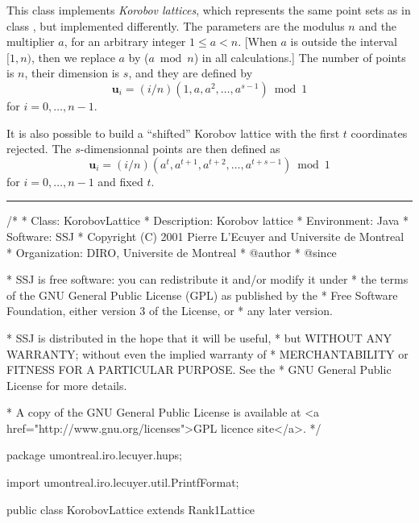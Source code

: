 
This class implements \emph{Korobov lattices}, which represents the same point
sets as in class , but implemented differently.
The parameters are the modulus $n$ and the multiplier $a$, for an arbitrary
integer $1 \le a < n$. [When  $a$ is outside the interval $[1,n)$, then we
replace  $a$ by ($a \bmod n$) in all calculations.]
The number of points is $n$, their dimension is
$s$, and they are defined by
\[
  \mathbf{u}_i = (i/n)(1, a, a^2, \ldots, a^{s-1}) \bmod 1
\]
for $i=0,\dots,n-1$.

It is also possible to build a ``shifted'' Korobov lattice with the first
$t$ coordinates rejected. The $s$-dimensionnal points are then defined as
$$
  \mathbf{u}_i = (i/n)(a^{t}, a^{t+1}, a^{t+2}, \ldots, a^{t+s-1}) \bmod 1
$$
for $i=0,\dots,n-1$ and fixed $t$.

\bigskip\hrule\bigskip

\begin{code}
\begin{hide}
/*
 * Class:        KorobovLattice
 * Description:  Korobov lattice
 * Environment:  Java
 * Software:     SSJ
 * Copyright (C) 2001  Pierre L'Ecuyer and Universite de Montreal
 * Organization: DIRO, Universite de Montreal
 * @author
 * @since

 * SSJ is free software: you can redistribute it and/or modify it under
 * the terms of the GNU General Public License (GPL) as published by the
 * Free Software Foundation, either version 3 of the License, or
 * any later version.

 * SSJ is distributed in the hope that it will be useful,
 * but WITHOUT ANY WARRANTY; without even the implied warranty of
 * MERCHANTABILITY or FITNESS FOR A PARTICULAR PURPOSE.  See the
 * GNU General Public License for more details.

 * A copy of the GNU General Public License is available at
   <a href="http://www.gnu.org/licenses">GPL licence site</a>.
 */
\end{hide}
package umontreal.iro.lecuyer.hups;
\begin{hide}
import umontreal.iro.lecuyer.util.PrintfFormat;
\end{hide}

public class KorobovLattice extends Rank1Lattice \begin{hide} {
   protected int genA;            // multiplier a
   private int genT;              // shift t

   private void initN (int n, int t) {
      int a = (genA %
      genT = t;
      long[] B = new long[dim];
      B[0] = 1;
      int j;
      for (j = 0; j < t; j++)
         B[0] *= a;
      v[0] = B[0] * normFactor;
      for (j = 1; j < dim; j++) {
         B[j] = (a * B[j - 1]) %
         v[j] = normFactor * B[j];
      }
   }

   // Method modPower is inherited from Rank1Lattice.
\end{hide}
\end{code}

